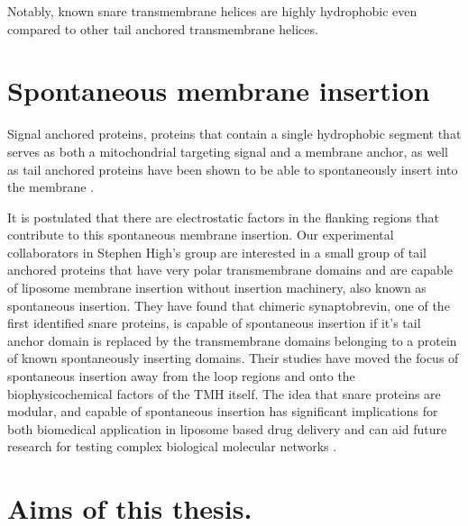 Notably, known \gls{snare} transmembrane helices are highly hydrophobic even compared to other tail anchored transmembrane helices.

\section{Spontaneous membrane insertion}
Signal anchored proteins, proteins that contain a single hydrophobic segment that serves as both a mitochondrial targeting signal and a membrane anchor, as well as tail anchored proteins have been shown to be able to spontaneously insert into the membrane \cite{Elisa2012, Lan2000, Colombo2009}.

It is postulated that there are electrostatic factors in the flanking regions that contribute to this spontaneous membrane insertion. Our experimental collaborators in Stephen High’s group are interested in a small group of tail anchored proteins that have very polar transmembrane domains and are capable of liposome membrane insertion without insertion machinery, also known as spontaneous insertion. They have found that chimeric synaptobrevin, one of the first identified \gls{snare} proteins, is capable of spontaneous insertion if it’s tail anchor domain is replaced by the transmembrane domains belonging to a protein of known spontaneously inserting domains. Their studies have moved the focus of spontaneous insertion away from the loop regions and onto the biophysicochemical factors of the TMH itself. The idea that \gls{snare} proteins are modular, and capable of spontaneous insertion has significant implications for both biomedical application in liposome based drug delivery and can aid future research for testing complex biological molecular networks \cite{Allen2013, Nordlund2014}.

\section{Aims of this thesis.}
